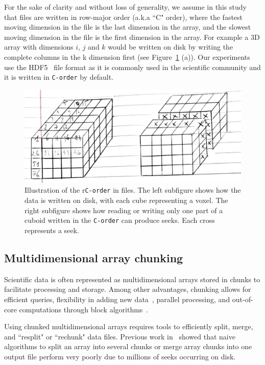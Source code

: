 \documentclass[conference]{IEEEtran}
\begin{document}
For the sake of clarity and without loss of generality,
 we assume in this study that files are written in row-major order (a.k.a
``C" order), where the fastest moving dimension in the file is the last
dimension in the array, and the slowest moving dimension in the file is the first
dimension in the array. For example a 3D array with dimensions $i$, $j$ and $k$
would be written on disk by writing the complete columns in the k dimension first
(see Figure~\ref{fig:seeks_and_rowmajor} (a)).
Our experiments use the HDF5~\cite{hdf5} file format as it is commonly used in the
scientific community and it is written in \texttt{C-order} by default.

\begin{figure}[h]
  \centering
  \includegraphics[scale=0.35]{./figures/new/seeks_and_rowmajor.jpeg}
  \caption{Illustration of the r\texttt{C-order} in files. The left subfigure
  shows how the data is written on disk, with each cube representing a voxel. The
  right subfigure shows how reading or writing only one part of a cuboid written
  in the \texttt{C-order} can produce seeks. Each cross represents a seek.}
  \label{fig:seeks_and_rowmajor}
\end{figure}

\subsection{Multidimensional array chunking}
Scientific data is often represented as multidimensional arrays stored in
chunks to facilitate processing and storage. Among other advantages, chunking
allows for efficient queries, flexibility in adding new
data~\cite{optimal_chuking}, parallel processing, and out-of-core
computations through block algorithms~\cite{matthew_rocklin-proc-scipy-2015}.

Using chunked multidimensional arrays requires tools to efficiently split,
merge, and ``resplit" or ``rechunk" data files. Previous work in~\cite{seqalgorithms}
showed that naive algorithms to split an array into several chunks or merge
array chunks into one output file perform very poorly due to millions of seeks
occurring on disk.
\end{document}
